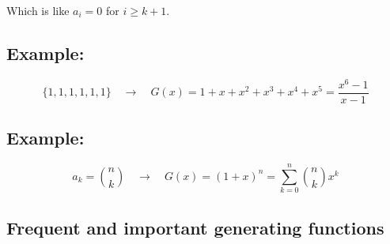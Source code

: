 \documentclass[11pt]{article}
\begin{document}
Which is like $a_i = 0$ for $i \geq k + 1$.

\subsection*{Example:}
\[
\{1, 1, 1, 1, 1, 1\} \quad \rightarrow \quad G(x) = 1 + x + x^2 + x^3 + x^4 + x^5 = \frac{x^6 - 1}{x - 1}
\]

\subsection*{Example:}
\[
a_k = \binom{n}{k} \quad \rightarrow \quad G(x) = (1 + x)^n = \sum_{k=0}^{n} \binom{n}{k} x^k
\]

\subsection{Frequent and important generating functions}
\end{document}
